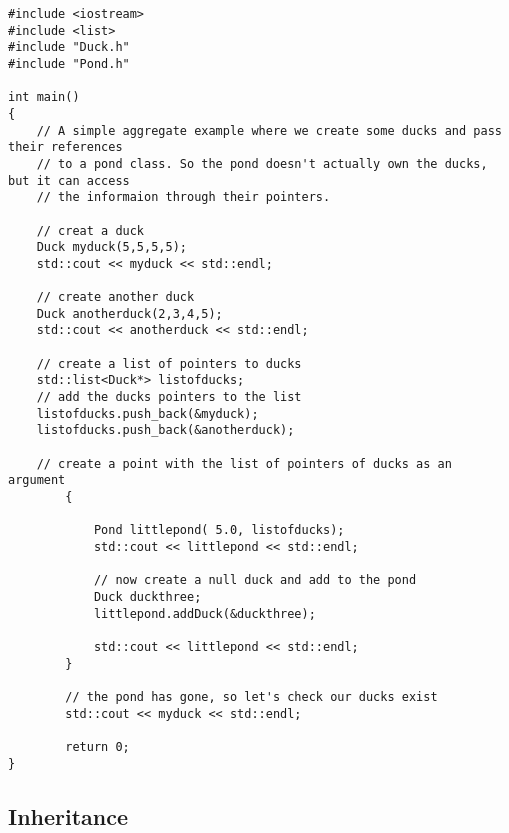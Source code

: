 \begin{lstlisting}
#include <iostream>
#include <list>
#include "Duck.h"
#include "Pond.h"

int main()
{
	// A simple aggregate example where we create some ducks and pass their references
	// to a pond class. So the pond doesn't actually own the ducks, but it can access
	// the informaion through their pointers.

	// creat a duck
	Duck myduck(5,5,5,5);
	std::cout << myduck << std::endl;

	// create another duck
	Duck anotherduck(2,3,4,5);
	std::cout << anotherduck << std::endl;

	// create a list of pointers to ducks
	std::list<Duck*> listofducks;
	// add the ducks pointers to the list
	listofducks.push_back(&myduck);
	listofducks.push_back(&anotherduck);

	// create a point with the list of pointers of ducks as an argument
		{
			
			Pond littlepond( 5.0, listofducks);
			std::cout << littlepond << std::endl;

			// now create a null duck and add to the pond
			Duck duckthree;
			littlepond.addDuck(&duckthree);
	
			std::cout << littlepond << std::endl;
		}

		// the pond has gone, so let's check our ducks exist
		std::cout << myduck << std::endl;

		return 0;
}
\end{lstlisting}

\subsection{Inheritance}

